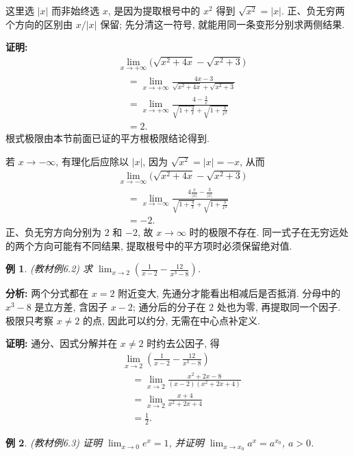 \documentclass[UTF8,openany]{ctexbook}
\theoremstyle{chinesetextbook}
\newtheorem{example}{例}[section]
\newenvironment{cnproof}{\par\indent\textbf{证明:} \ignorespaces}{\par}
\begin{document}
这里选 $|x|$ 而非始终选 $x$, 是因为提取根号中的 $x^2$ 得到 $\sqrt{x^2}=|x|$. 正、负无穷两个方向的区别由 $x/|x|$ 保留; 先分清这一符号, 就能用同一条变形分别求两侧结果.
\begin{cnproof}
\[
\begin{aligned}
&\lim_{x\to+\infty}\bigl(\sqrt{x^2+4x}-\sqrt{x^2+3}\bigr)\\
&\quad=\lim_{x\to+\infty}\frac{4x-3}{\sqrt{x^2+4x}+\sqrt{x^2+3}}\\
&\quad=\lim_{x\to+\infty}\frac{4-\frac3x}{\sqrt{1+\frac4x}+\sqrt{1+\frac3{x^2}}}\\
&\quad=2.
\end{aligned}
\]
根式极限由本节前面已证的平方根极限结论得到.

若 $x\to-\infty$, 有理化后应除以 $|x|$, 因为 $\sqrt{x^2}=|x|=-x$, 从而
\[
\begin{aligned}
&\lim_{x\to-\infty}\bigl(\sqrt{x^2+4x}-\sqrt{x^2+3}\bigr)\\
&\quad=\lim_{x\to-\infty}\frac{4\frac{x}{|x|}-\frac3{|x|}}{\sqrt{1+\frac4x}+\sqrt{1+\frac3{x^2}}}\\
&\quad=-2.
\end{aligned}
\]
正、负无穷方向分别为 $2$ 和 $-2$, 故 $x\to\infty$ 时的极限不存在. 同一式子在无穷远处的两个方向可能有不同结果, 提取根号中的平方项时必须保留绝对值.
\end{cnproof}
\begin{example}
(教材例6.2) 求 $\displaystyle \lim_{x\to2}(\frac1{x-2}-\frac{12}{x^3-8})$.
\end{example}
\par\indent\textbf{分析:} 两个分式都在 $x=2$ 附近变大, 先通分才能看出相减后是否抵消. 分母中的 $x^3-8$ 是立方差, 含因子 $x-2$; 通分后的分子在 $2$ 处也为零, 再提取同一个因子. 极限只考察 $x\ne2$ 的点, 因此可以约分, 无需在中心点补定义.
\begin{cnproof}
通分、因式分解并在 $x\ne2$ 时约去公因子, 得
\[
\begin{aligned}
&\lim_{x\to2}\left(\frac1{x-2}-\frac{12}{x^3-8}\right)\\
&\quad=\lim_{x\to2}\frac{x^2+2x-8}{(x-2)(x^2+2x+4)}\\
&\quad=\lim_{x\to2}\frac{x+4}{x^2+2x+4}\\
&\quad=\frac12.
\end{aligned}
\]
\end{cnproof}
\begin{example}
(教材例6.3) 证明 $\displaystyle \lim_{x\to0}e^x=1$, 并证明 $\displaystyle \lim_{x\to x_0}a^x=a^{x_0}$, $a>0$.
\end{example}
\end{document}
